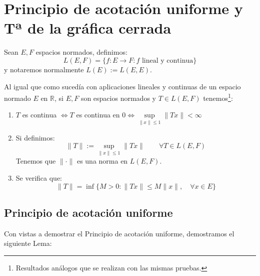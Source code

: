 \chapter{Principio de acotación uniforme y Tª de la gráfica cerrada}

\begin{definicion}
    Sean $E,F$ espacios normados, definimos:
    \begin{equation*}
        L(E,F) = \{f:E\to F : f \text{\ lineal y continua}\}
    \end{equation*}
    y notaremos normalmente $L(E) := L(E,E)$.
\end{definicion}

\begin{prop}
    Al igual que como sucedía con aplicaciones lineales y continuas de un espacio normado $E$ en $\mathbb{R}$, si $E,F$ son espacios normados y $T\in L(E,F)$ tenemos\footnote{Resultados análogos que se realizan con las mismas pruebas.}:
    \begin{enumerate}
        \item $T$ es continua $\Longleftrightarrow T$ es continua en $0 \Longleftrightarrow \sup\limits_{\|x\|\leq 1}\|Tx\| < \infty$
        \item Si definimos:
            \begin{equation*}
                \|T\| := \sup_{\|x\|\leq 1}\|Tx\| \qquad \forall T\in L(E,F)
            \end{equation*}
            Tenemos que $\|\cdot \|$ es una norma en $L(E,F)$.
        \item Se verifica que:
            \begin{equation*}
                \|T\| = \inf\{M>0 : \|Tx\| \leq M\|x\|, \quad \forall x\in E\}
            \end{equation*}
    \end{enumerate}
\end{prop}

\section{Principio de acotación uniforme}
\noindent
Con vistas a demostrar el Principio de acotación uniforme, demostramos el siguiente Lema:

